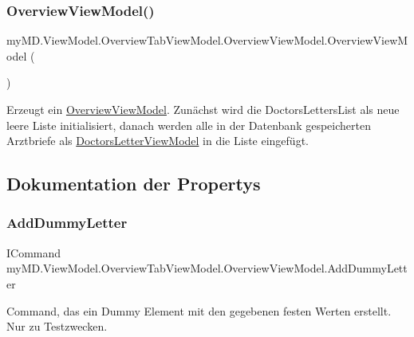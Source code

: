 \subsubsection{\texorpdfstring{Overview\+View\+Model()}{OverviewViewModel()}}
{\footnotesize\ttfamily my\+M\+D.\+View\+Model.\+Overview\+Tab\+View\+Model.\+Overview\+View\+Model.\+Overview\+View\+Model (\begin{DoxyParamCaption}{ }\end{DoxyParamCaption})}



Erzeugt ein \mbox{\hyperlink{classmy_m_d_1_1_view_model_1_1_overview_tab_view_model_1_1_overview_view_model}{Overview\+View\+Model}}. Zunächst wird die Doctors\+Letters\+List als neue leere Liste initialisiert, danach werden alle in der Datenbank gespeicherten Arztbriefe als \mbox{\hyperlink{classmy_m_d_1_1_view_model_1_1_overview_tab_view_model_1_1_doctors_letter_view_model}{Doctors\+Letter\+View\+Model}} in die Liste eingefügt. 



\subsection{Dokumentation der Propertys}
\mbox{\label{classmy_m_d_1_1_view_model_1_1_overview_tab_view_model_1_1_overview_view_model_a82f6eaa58ba38f2761d5f6e3d9ac9518}} 
\subsubsection{\texorpdfstring{Add\+Dummy\+Letter}{AddDummyLetter}}
{\footnotesize\ttfamily I\+Command my\+M\+D.\+View\+Model.\+Overview\+Tab\+View\+Model.\+Overview\+View\+Model.\+Add\+Dummy\+Letter\hspace{0.3cm}{\ttfamily [get]}}



Command, das ein Dummy Element mit den gegebenen festen Werten erstellt. Nur zu Testzwecken. 

